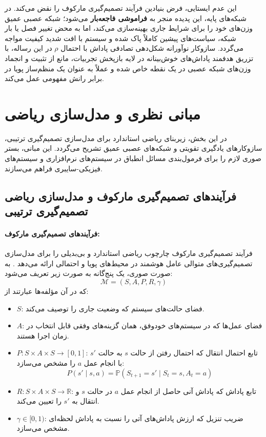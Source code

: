 \documentclass[oneside,openany,phd]{TMU-Thesis}
\begin{document}
این عدم ایستایی، فرض بنیادین فرآیند تصمیم‌گیری مارکوف را نقض می‌کند. در شبکه‌های  پایه، این پدیده منجر به \textbf{فراموشی فاجعه‌بار} می‌شود؛ شبکه عصبی عمیق وزن‌های خود را برای شرایط جاری بهینه‌سازی می‌کند، اما به محض تغییر فصل یا بار شبکه، سیاست‌های پیشین کاملاً پاک شده و سیستم با افت شدید کیفیت مواجه می‌گردد. سازوکار نوآورانه شکل‌دهی تصادفی پاداش با احتمال $\rho$ در این رساله، با تزریق هدفمند پاداش‌های خوش‌بینانه در لایه بازپخش تجربیات، مانع از تثبیت و انجماد وزن‌های شبکه عصبی در یک نقطه خاص شده و عملاً به عنوان یک منظم‌ساز پویا در برابر رانش مفهومی عمل می‌کند.

\section{مبانی نظری و مدل‌سازی ریاضی}

در این بخش، زیربنای ریاضی استاندارد برای مدل‌سازی تصمیم‌گیری ترتیبی، سازوکارهای یادگیری تقویتی و شبکه‌های عصبی عمیق تشریح می‌گردد. این مبانی، بستر صوری لازم را برای فرمول‌بندی مسائل انطباق در سیستم‌های نرم‌افزاری و سیستم‌های فیزیکی-سایبری فراهم می‌سازند.

\subsection{فرآیندهای تصمیم‌گیری مارکوف و مدل‌سازی ریاضی تصمیم‌گیری ترتیبی}
\label{subsec:mdp_theoretical_foundations}

\paragraph{فرآیندهای تصمیم‌گیری مارکوف:}

فرآیند تصمیم‌گیری مارکوف چارچوب ریاضی استاندارد و بی‌بدیلی را برای مدل‌سازی تصمیم‌گیری‌های متوالی عامل هوشمند در محیط‌های پویا و احتمالی ارائه می‌دهد \cite{puterman1994markov}. به صورت صوری، یک  پنج‌گانه به صورت زیر تعریف می‌شود:
$$\mathcal{M} = (S, A, P, R, \gamma)$$
که در آن مؤلفه‌ها عبارتند از:
\begin{itemize}
    \item $S$: فضای حالت‌های سیستم که وضعیت جاری را توصیف می‌کند.
    \item $A$: فضای عمل‌ها که در سیستم‌های خودوفق، همان گزینه‌های وفقی قابل انتخاب در زمان اجرا هستند.
    \item $P: S \times A \times S \rightarrow [0, 1]$: تابع احتمال انتقال که احتمال رفتن از حالت $s$ به حالت $s'$ با انجام عمل $a$ را مشخص می‌سازد:
    $$P(s' \mid s, a) = \mathbb{P}(S_{t+1} = s' \mid S_t = s, A_t = a)$$
    \item $R: S \times A \times S \rightarrow \mathbb{R}$: تابع پاداش که پاداش آنی حاصل از انجام عمل $a$ در حالت $s$ و انتقال به $s'$ را تعیین می‌کند.
    \item $\gamma \in [0, 1)$: ضریب تنزیل که ارزش پاداش‌های آتی را نسبت به پاداش لحظه‌ای مشخص می‌سازد.
\end{itemize}
\end{document}
